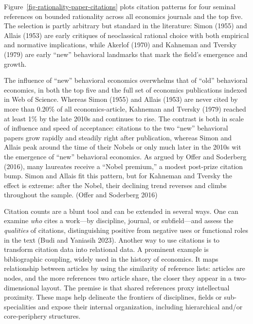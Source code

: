 \documentclass[
]{interact}
\begin{document}
Figure~\ref{fig-rationality-paper-citations} plots citation patterns for
four seminal references on bounded rationality across all economics
journals and the top five. The selection is partly arbitrary but
standard in the literature: Simon (1955) and Allais (1953) are early
critiques of neoclassical rational choice with both empirical and
normative implications, while Akerlof (1970) and Kahneman and Tversky
(1979) are early ``new'' behavioral landmarks that mark the field's
emergence and growth.

The influence of ``new'' behavioral economics overwhelms that of ``old''
behavioral economics, in both the top five and the full set of economics
publications indexed in Web of Science. Whereas Simon (1955) and Allais
(1953) are never cited by more than 0.20\% of all economics-article,
Kahneman and Tversky (1979) reached at least 1\% by the late 2010s and
continues to rise. The contrast is both in scale of influence and speed
of acceptance: citations to the two ``new'' behavioral papers grow
rapidly and steadily right after publication, whereas Simon and Allais
peak around the time of their Nobels or only much later in the 2010s wit
the emergence of ``new'' behavioral economics. As argued by Offer and
Soderberg (2016), many laureates receive a ``Nobel premium,'' a modest
post-prize citation bump. Simon and Allais fit this pattern, but for
Kahneman and Tversky the effect is extreme: after the Nobel, their
declining trend reverses and climbs throughout the sample. (Offer and
Soderberg 2016)

Citation counts are a blunt tool and can be extended in several ways.
One can examine \emph{who} cites a work---by discipline, journal, or
subfield---and assess the \emph{qualities} of citations, distinguishing
positive from negative uses or functional roles in the text (Budi and
Yaniasih 2023). Another way to use citations is to transform citation
data into relational data. A prominent example is bibliographic
coupling, widely used in the history of economics. It maps relationship
between articles by using the similarity of reference lists: articles
are nodes, and the more references two article share, the closer they
appear in a two-dimensional layout. The premise is that shared
references proxy intellectual proximity. These maps help delineate the
frontiers of disciplines, fields or sub-specialities and expose their
internal organization, including hierarchical and/or core-periphery
structures.
\end{document}
